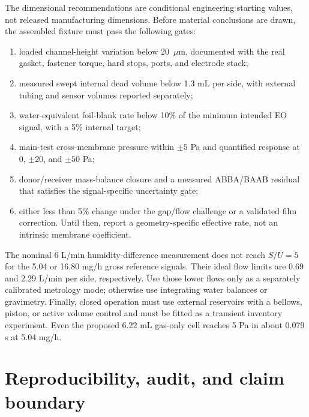 \documentclass[10pt,a4paper]{article}
\begin{document}
\clearpage
The dimensional recommendations are conditional engineering starting values,
not released manufacturing dimensions. Before material conclusions are drawn,
the assembled fixture must pass the following gates:

\begin{enumerate}
  \item loaded channel-height variation below 20~$\mu$m, documented with the
  real gasket, fastener torque, hard stops, ports, and electrode stack;
  \item measured swept internal dead volume below 1.3 mL per side, with
  external tubing and sensor volumes reported separately;
  \item water-equivalent foil-blank rate below 10\% of the minimum intended EO
  signal, with a 5\% internal target;
  \item main-test cross-membrane pressure within $\pm5$ Pa and quantified
  response at 0, $\pm20$, and $\pm50$ Pa;
  \item donor/receiver mass-balance closure and a measured ABBA/BAAB residual
  that satisfies the signal-specific uncertainty gate;
  \item either less than 5\% change under the gap/flow challenge or a validated
  film correction. Until then, report a geometry-specific effective rate, not
  an intrinsic membrane coefficient.
\end{enumerate}

\clearpage
The nominal 6 L/min humidity-difference measurement does not reach $S/U=5$ for
the 5.04 or 16.80 mg/h gross reference signals. Their ideal flow limits are
0.69 and 2.29 L/min per side, respectively. Use those lower flows only as a
separately calibrated metrology mode; otherwise use integrating water balances
or gravimetry. Finally, closed operation must use external reservoirs with a
bellows, piston, or active volume control and must be fitted as a transient
inventory experiment. Even the proposed 6.22 mL gas-only cell reaches 5 Pa in
about 0.079 s at 5.04 mg/h.

\section{Reproducibility, audit, and claim boundary}
\end{document}
